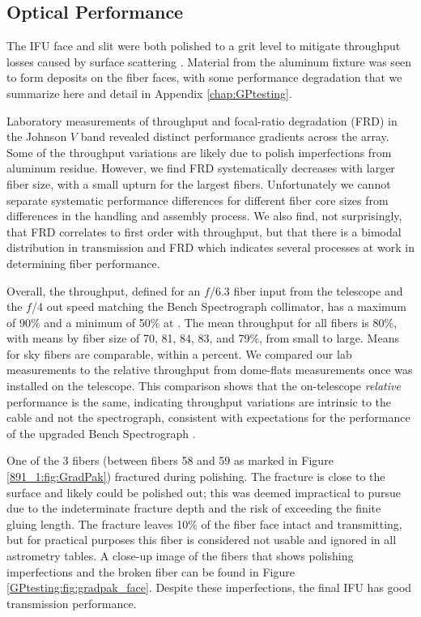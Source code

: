 \subsection{Optical Performance}

\label{891_1:sec:gradpak_performance}

The IFU face and slit were both polished to a  grit
level to mitigate throughput losses caused by surface scattering
\citep{Eigenbrot12}. Material from the aluminum fixture was seen to
form deposits on the fiber faces, with some performance degradation
that we summarize here and detail in Appendix \ref{chap:GPtesting}.

Laboratory measurements of throughput and focal-ratio degradation
(FRD) in the Johnson $V$ band revealed distinct performance gradients
across the array. Some of the throughput variations are likely due to
polish imperfections from aluminum residue. However, we find FRD
systematically decreases with larger fiber size, with a small upturn
for the largest fibers. Unfortunately we cannot separate systematic
performance differences for different fiber core sizes from
differences in the handling and assembly process. We also find, not
surprisingly, that FRD correlates to first order with throughput, but
that there is a bimodal distribution in transmission and FRD which
indicates several processes at work in determining fiber performance.

Overall, the throughput, defined for an $f$/6.3 fiber input from the
telescope and the $f$/4 out speed matching the Bench Spectrograph
collimator, has a maximum of 90\% and a minimum of 50\% at
. The mean throughput for all fibers is 80\%, with
means by fiber size of 70, 81, 84, 83, and 79\%, from small to
large. Means for sky fibers are comparable, within a percent. We
compared our lab measurements to the relative throughput from
dome-flats measurements once \GP was installed on the telescope. This
comparison shows that the on-telescope {\it relative} performance is
the same, indicating throughput variations are intrinsic to the cable
and not the spectrograph, consistent with expectations for the
performance of the upgraded Bench Spectrograph
\citep{Bershady08,Knezek10}.

One of the 3 fibers (between fibers 58 and 59 as marked in Figure
\ref{891_1:fig:GradPak}) fractured during polishing. The fracture is
close to the surface and likely could be polished out; this was deemed
impractical to pursue due to the indeterminate fracture depth and the
risk of exceeding the finite gluing length. The fracture leaves 10\%
of the fiber face intact and transmitting, but for practical purposes
this fiber is considered not usable and ignored in all astrometry
tables.  A close-up image of the \GP fibers that shows polishing
imperfections and the broken fiber can be found in Figure
\ref{GPtesting:fig:gradpak_face}.  Despite these imperfections, the
final IFU has good transmission performance.


